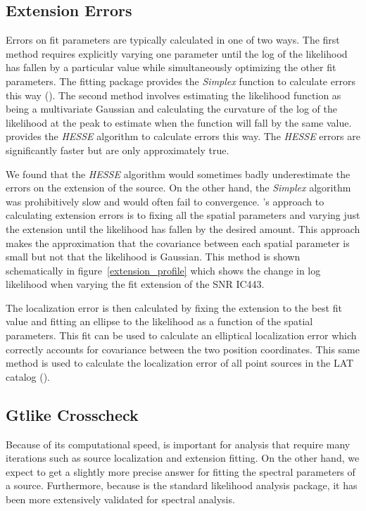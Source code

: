 \documentclass[12pt,preprint]{aastex}
\newcommand{\pointlike}{\text{\em pointlike}\xspace}
\newcommand{\gtlike}{\text{\em gtlike}\xspace}
\newcommand{\minuit}{\text{\em Minuit}\xspace}
\begin{document}
\subsection{Extension Errors}
\label{extension_error}

Errors on fit parameters are typically calculated in one of two
ways. The first method requires explicitly varying one parameter
until the log of the likelihood has fallen by a particular value while
simultaneously optimizing the other fit parameters. The \minuit fitting
package provides the {\em Simplex} function to calculate errors this way
(\cite{minuit_documentation}).  The second method involves estimating the
likelihood function as being a multivariate Gaussian and calculating the
curvature of the log of the likelihood at the peak to estimate when the
function will fall by the same value. \minuit provides the {\em HESSE}
algorithm to calculate errors this way.  The {\em HESSE} errors are
significantly faster but are only approximately true.

We found that the {\em HESSE} algorithm would sometimes badly
underestimate the errors on the extension of the source.  On the other
hand, the {\em Simplex} algorithm was prohibitively slow and would often
fail to convergence. \pointlike's approach to calculating extension errors
is to fixing all the spatial parameters and varying just the extension
until the likelihood has fallen by the desired amount.  This approach
makes the approximation that the covariance between each spatial parameter
is small but not that the likelihood is Gaussian. This method 
is shown schematically in figure~\ref{extension_profile} which shows
the change in log likelihood when varying the fit extension of
the SNR IC443.

The localization error is then calculated by fixing the extension to the
best fit value and fitting an ellipse to the likelihood as a function
of the spatial parameters.  This fit can be used to calculate an
elliptical localization error which correctly accounts for covariance
between the two position coordinates.  This same method is used to
calculate the localization error of all point sources in the LAT catalog
(\cite{first_cat}).

\subsection{Gtlike Crosscheck}
\label{gtlike_crosscheck}

Because of its computational speed, \pointlike is important for analysis
that require many iterations such as source localization and extension
fitting.  On the other hand, we expect \gtlike to get a slightly
more precise answer for fitting the spectral parameters of a source.
Furthermore, because \gtlike is the standard likelihood analysis package,
it has been more extensively validated for spectral analysis.
\end{document}
